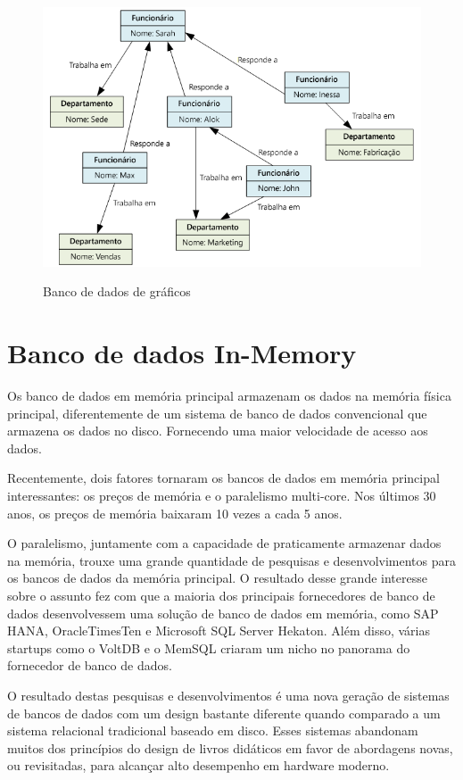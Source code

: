 \begin{compactitem}
\begin{figure}[H]
  \setlength{\abovecaptionskip}{0pt}
  \setlength{\belowcaptionskip}{0pt}
  \caption[Banco de dados de gráficos]{Banco de dados de gráficos}
  \centering
  \includegraphics[width=.65\textwidth]{imagem/NoSQL_Graficos.png}
  \captionsetup{justification=centering}
  \label{fig:5}
\end{figure}
\end{compactitem}


\section{Banco de dados In-Memory}
Os banco de dados em memória principal armazenam os dados na memória física principal, diferentemente de um sistema de banco de dados convencional que armazena os dados no disco. Fornecendo uma maior velocidade de acesso aos dados. \cite{garcia}

Recentemente, dois fatores tornaram os bancos de dados em memória principal interessantes: os preços de memória e o paralelismo multi-core. Nos últimos 30 anos, os preços de memória baixaram 10 vezes a cada 5 anos. 

O paralelismo, juntamente com a capacidade de praticamente armazenar dados na memória, trouxe uma grande quantidade de  pesquisas e desenvolvimentos para os bancos de dados da memória principal. O resultado desse grande interesse sobre o assunto fez com que a maioria dos principais fornecedores de banco de dados desenvolvessem uma solução de banco de dados em memória, como SAP HANA, OracleTimesTen e Microsoft SQL Server Hekaton. Além disso, várias startups como o VoltDB e o MemSQL criaram um nicho no panorama do fornecedor de banco de dados.

O resultado destas pesquisas e desenvolvimentos é uma nova geração de sistemas de bancos de dados com um design bastante diferente quando comparado a um sistema relacional tradicional baseado em disco. Esses sistemas abandonam muitos dos princípios do design de livros didáticos em favor de abordagens novas, ou revisitadas, para alcançar alto desempenho em hardware moderno. \cite{Faerber}


